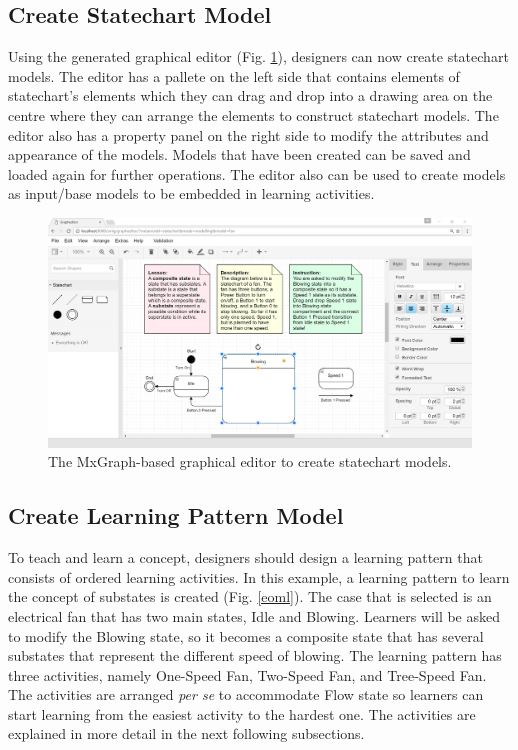 \documentclass[conference]{IEEEtran}
\begin{document}
\subsection{Create Statechart Model}
Using the generated graphical editor (Fig. \ref{ide}), designers can now create statechart models. The editor has a pallete on the left side that contains elements of statechart's elements which they can drag and drop into a drawing area on the centre where they can arrange the elements to construct statechart models. The editor also has a property panel on the right side to modify the attributes and appearance of the models. Models that have been created can be saved and loaded again for further operations. The editor also can be used to create models as input/base models to be embedded in learning activities.        

\begin{figure}[!t]
\centering
\includegraphics[width=\linewidth]{ide}
\caption{The MxGraph-based graphical editor to create statechart models.}
\label{ide}
\end{figure}

\subsection{Create Learning Pattern Model}
To teach and learn a concept, designers should design a learning pattern that consists of ordered learning activities. In this example, a learning pattern to learn the concept of substates is created (Fig. \ref{eoml}). The case that is selected is an electrical fan that has two main states, Idle and Blowing. Learners will be asked to modify the Blowing state, so it becomes a composite state that has several substates that represent the different speed of blowing. The learning pattern has three activities, namely One-Speed Fan, Two-Speed Fan, and Tree-Speed Fan. The activities are arranged \textit{per se} to accommodate Flow state \cite{csikszentmihalyi2014toward} so learners can start learning from the easiest activity to the hardest one. The activities are explained in more detail in the next following subsections.
  
\end{document}

